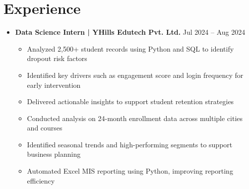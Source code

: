 \documentclass[letterpaper,11pt]{article}
\begin{document}
\section{Experience}
\begin{itemize}[leftmargin=*]

\item \textbf{Data Science Intern | YHills Edutech Pvt. Ltd.} \hfill Jul 2024 -- Aug 2024
\begin{itemize}
\item Analyzed 2,500+ student records using Python and SQL to identify dropout risk factors
\item Identified key drivers such as engagement score and login frequency for early intervention
\item Delivered actionable insights to support student retention strategies

\item Conducted analysis on 24-month enrollment data across multiple cities and courses
\item Identified seasonal trends and high-performing segments to support business planning
\item Automated Excel MIS reporting using Python, improving reporting efficiency
\end{itemize}

\end{itemize}

\end{document}
